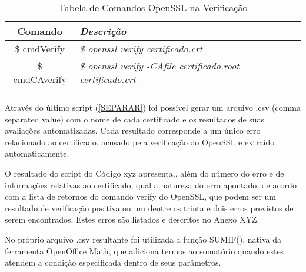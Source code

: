 	    \begin{center}
			\begin{longtable}{c>{\em}l}
			\toprule
			\textbf{Comando} & \textbf{Descrição} \\ \midrule
			\$ cmdVerify & \$ openssl verify certificado.crt \\ 
			\rowcolor[gray]{0.9}
			\$ cmdCAverify & \$ openssl verify -CAfile certificado.root certificado.crt \\
			\bottomrule
			\caption{Tabela de Comandos OpenSSL na Verificação}
			\end{longtable}
		\end{center}
	    Através do último script (\ref{SEPARAR}) foi possível gerar um arquivo .csv (comma separated value) com o nome de cada certificado e os resultados de suas avaliações automatizadas. Cada resultado corresponde a um único erro relacionado ao certificado, acusado pela verificação do OpenSSL e extraído automaticamente.

    	O resultado do script do Código xyz apresenta,, além do número do erro e de informações relativas ao certificado, qual a natureza do erro apontado, de acordo com a lista de retornos do comando verify do OpenSSL, que podem ser um resultado de verificação positiva ou um dentre os trinta e dois erros previstos de serem encontrados. Estes erros são listados e descritos no Anexo XYZ.

    	No próprio arquivo .csv resultante foi utilizada a função SUMIF(), nativa da ferramenta OpenOffice Math, que adiciona termos ao somatório quando estes atendem a condição especificada dentro de seus parâmetros.